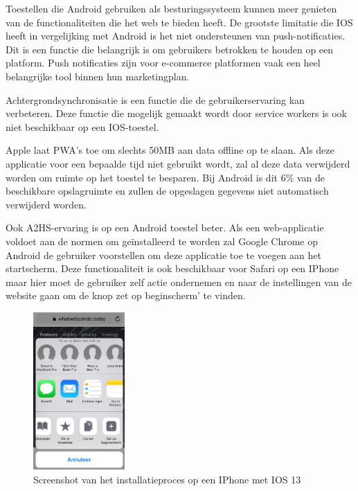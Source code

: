 Toestellen die Android gebruiken als besturingssysteem kunnen meer genieten van de functionaliteiten die het web te bieden heeft.
De grootste limitatie die IOS heeft in vergelijking met Android is het niet ondersteunen van push-notificaties. Dit is een functie die belangrijk is om gebruikers betrokken te houden op een platform. Push notificaties zijn voor e-commerce platformen vaak een heel belangrijke tool binnen hun marketingplan.
\autocite{Anastasia2017}

Achtergrondsynchronisatie is een functie die de gebruikerservaring kan verbeteren. Deze functie die mogelijk gemaakt wordt door service workers is ook niet beschikbaar op een IOS-toestel.

Apple laat PWA’s toe om slechts 50MB aan data offline op te slaan. Als deze applicatie voor een bepaalde tijd niet gebruikt wordt, zal al deze data verwijderd worden om ruimte op het toestel te besparen. Bij Android is dit 6\% van de beschikbare opslagruimte en zullen de opgeslagen gegevens niet automatisch verwijderd worden.

Ook A2HS-ervaring is op een Android toestel beter. Als een web-applicatie voldoet aan de normen om geïnstalleerd te worden zal Google Chrome op Android de gebruiker voorstellen om deze applicatie toe te voegen aan het startscherm. Deze functionaliteit is ook beschikbaar voor Safari op een IPhone maar hier moet de gebruiker zelf actie ondernemen en naar de instellingen van de website gaan om de knop zet op beginscherm’ te vinden.

\begin{figure}[H]
	\centering
	\includegraphics[width=35mm]{./img/installation_ios.png}
	\caption{Screenshot van het installatieproces op een IPhone met IOS 13}
\end{figure}

